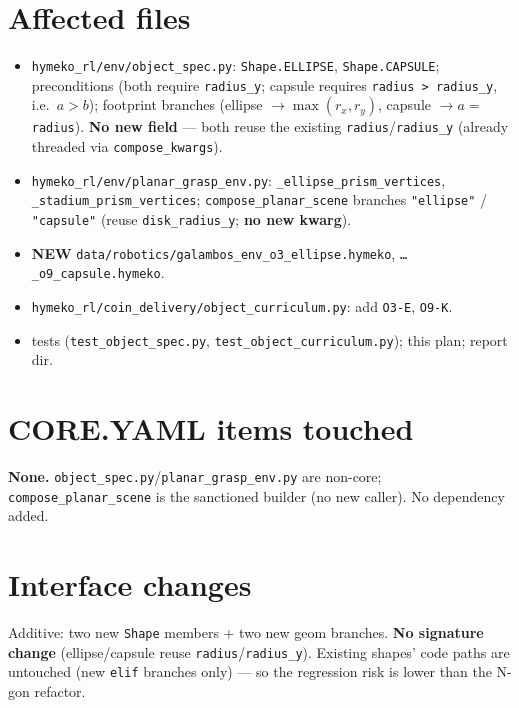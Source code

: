 \documentclass[11pt]{article}
\begin{document}
\section{Affected files}
\begin{itemize}[nosep]
  \item \texttt{hymeko\_rl/env/object\_spec.py}: \texttt{Shape.ELLIPSE}, \texttt{Shape.CAPSULE}; preconditions
    (both require \texttt{radius\_y}; capsule requires \texttt{radius > radius\_y}, i.e.\ $a>b$); footprint
    branches (ellipse $\to\max(r_x,r_y)$, capsule $\to a{=}$\texttt{radius}). \textbf{No new field} --- both
    reuse the existing \texttt{radius}/\texttt{radius\_y} (already threaded via \texttt{compose\_kwargs}).
  \item \texttt{hymeko\_rl/env/planar\_grasp\_env.py}: \texttt{\_ellipse\_prism\_vertices},
    \texttt{\_stadium\_prism\_vertices}; \texttt{compose\_planar\_scene} branches \texttt{"ellipse"} /
    \texttt{"capsule"} (reuse \texttt{disk\_radius\_y}; \textbf{no new kwarg}).
  \item \textbf{NEW} \texttt{data/robotics/galambos\_env\_o3\_ellipse.hymeko},
    \texttt{\ldots\_o9\_capsule.hymeko}.
  \item \texttt{hymeko\_rl/coin\_delivery/object\_curriculum.py}: add \texttt{O3-E}, \texttt{O9-K}.
  \item tests (\texttt{test\_object\_spec.py}, \texttt{test\_object\_curriculum.py}); this plan; report dir.
\end{itemize}

\section{CORE.YAML items touched}
\textbf{None.} \texttt{object\_spec.py}/\texttt{planar\_grasp\_env.py} are non-core; \texttt{compose\_planar\_scene}
is the sanctioned builder (no new caller). No dependency added.

\section{Interface changes}
Additive: two new \texttt{Shape} members + two new geom branches. \textbf{No signature change} (ellipse/capsule
reuse \texttt{radius}/\texttt{radius\_y}). Existing shapes' code paths are untouched (new \texttt{elif}
branches only) --- so the regression risk is lower than the N-gon refactor.
\end{document}
